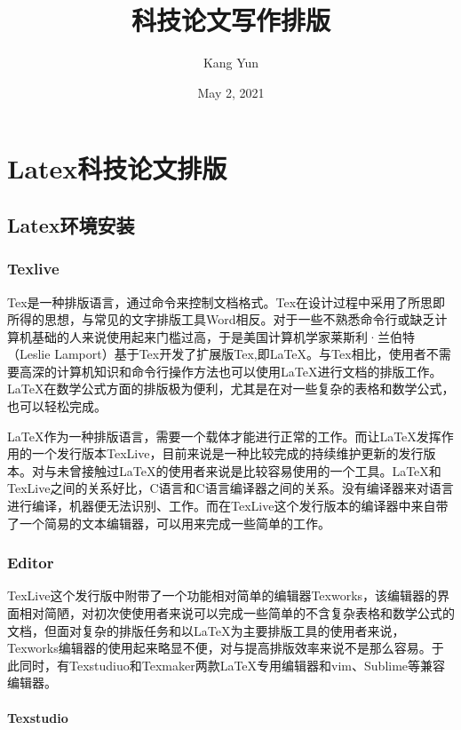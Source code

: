 \documentclass[cn,10pt,math=newtx,citestyle=gb7714-2015,bibstyle=gb7714-2015]{elegantbook}
\title{科技论文写作排版}
\author{Kang Yun}
\date{May 2, 2021}
\begin{document}
\maketitle
\frontmatter

\tableofcontents

\part{Latex科技论文排版}

\chapter{Latex环境安装}

\section{Texlive}

Tex是一种排版语言，通过命令来控制文档格式。Tex在设计过程中采用了所思即所得的思想，与常见的文字排版工具Word相反。对于一些不熟悉命令行或缺乏计算机基础的人来说使用起来门槛过高，于是美国计算机学家莱斯利·兰伯特（Leslie Lamport）基于Tex开发了扩展版Tex,即\LaTeX{}。与Tex相比，使用者不需要高深的计算机知识和命令行操作方法也可以使用\LaTeX{}进行文档的排版工作。\LaTeX{}在数学公式方面的排版极为便利，尤其是在对一些复杂的表格和数学公式，也可以轻松完成。

\LaTeX{}作为一种排版语言，需要一个载体才能进行正常的工作。而让\LaTeX{}发挥作用的一个发行版本TexLive，目前来说是一种比较完成的持续维护更新的发行版本。对与未曾接触过\LaTeX{}的使用者来说是比较容易使用的一个工具。\LaTeX{}和TexLive之间的关系好比，C语言和C语言编译器之间的关系。没有编译器来对语言进行编译，机器便无法识别、工作。而在TexLive这个发行版本的编译器中来自带了一个简易的文本编辑器，可以用来完成一些简单的工作。

\section{Editor}

TexLive这个发行版中附带了一个功能相对简单的编辑器Texworks，该编辑器的界面相对简陋，对初次使使用者来说可以完成一些简单的不含复杂表格和数学公式的文档，但面对复杂的排版任务和以\LaTeX{}为主要排版工具的使用者来说，Texworks编辑器的使用起来略显不便，对与提高排版效率来说不是那么容易。于此同时，有Texstudiuo和Texmaker两款\LaTeX{}专用编辑器和vim、Sublime等兼容编辑器。

\subsection{Texstudio}
\end{document}
